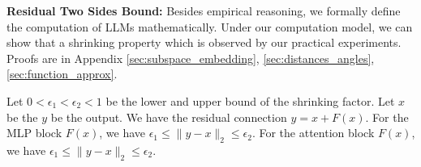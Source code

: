 



\textbf{Residual Two Sides Bound:} Besides empirical reasoning, we formally define the computation of LLMs mathematically. Under our computation model, we can show that a shrinking property which is observed by our practical experiments. Proofs are in Appendix \ref{sec:subspace_embedding}, \ref{sec:distances_angles}, \ref{sec:function_approx}.

\begin{lemma}[Informal]
Let $0 < \epsilon_1 < \epsilon_2< 1$ be the lower and upper bound of the shrinking factor.
Let $x$ be the $y$ be the output. We have the residual connection $y = x + F(x)$. For the MLP block $F(x)$,  
 we have $\epsilon_1 \leq \| y - x \|_2 \leq \epsilon_2$. For the attention block $F(x)$,  we have $\epsilon_1 \leq \| y - x \|_2 \leq \epsilon_2 $.  
\end{lemma}






